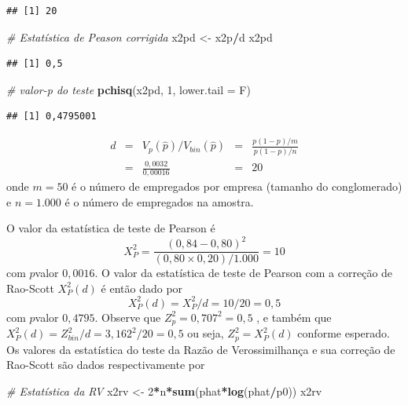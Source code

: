 \documentclass[]{book}
\newenvironment{Shaded}{\begin{snugshade}}{\end{snugshade}}
\newcommand{\KeywordTok}[1]{\textcolor[rgb]{0.13,0.29,0.53}{\textbf{#1}}}
\newcommand{\DataTypeTok}[1]{\textcolor[rgb]{0.13,0.29,0.53}{#1}}
\newcommand{\DecValTok}[1]{\textcolor[rgb]{0.00,0.00,0.81}{#1}}
\newcommand{\StringTok}[1]{\textcolor[rgb]{0.31,0.60,0.02}{#1}}
\newcommand{\CommentTok}[1]{\textcolor[rgb]{0.56,0.35,0.01}{\textit{#1}}}
\newcommand{\OperatorTok}[1]{\textcolor[rgb]{0.81,0.36,0.00}{\textbf{#1}}}
\newcommand{\NormalTok}[1]{#1}
\theoremstyle{definition}
\theoremstyle{definition}
\theoremstyle{definition}
\theoremstyle{remark}
\begin{document}
\begin{verbatim}
## [1] 20
\end{verbatim}

\begin{Shaded}
\begin{Highlighting}[]
\CommentTok{# Estatística de Peason corrigida}
\NormalTok{x2pd <-}\StringTok{ }\NormalTok{x2p}\OperatorTok{/}\NormalTok{d}
\NormalTok{x2pd}
\end{Highlighting}
\end{Shaded}

\begin{verbatim}
## [1] 0,5
\end{verbatim}

\begin{Shaded}
\begin{Highlighting}[]
\CommentTok{# valor-p do teste}
\KeywordTok{pchisq}\NormalTok{(x2pd, }\DecValTok{1}\NormalTok{, }\DataTypeTok{lower.tail =}\NormalTok{ F)}
\end{Highlighting}
\end{Shaded}

\begin{verbatim}
## [1] 0,4795001
\end{verbatim}

\[
\begin{array}{llcll}
d & = & V_{p}\left( \widehat{p}\right) /V_{bin}\left( \widehat{p}\right) & =
& \frac{p\left( 1-p\right) /m}{p\left( 1-p\right) /n} \\ 
& = & \frac{0,0032}{0,00016} & = & 20
\end{array}
\] onde \(m=50\) é o número de empregados por empresa (tamanho do
conglomerado) e \(n=1.000\) é o número de empregados na amostra.

O valor da estatística de teste de Pearson é \[
X_{P}^{2}=\frac{\left( 0,84-0,80\right) ^{2}}{\left( 0,80\times 0,20\right)
/1.000}=10 
\] com \(p\)valor \(0,0016\). O valor da estatística de teste de Pearson
com a correção de Rao-Scott \(X_{P}^{2}(d)\) é então dado por \[
X_{P}^{2}(d)=X_{P}^{2}/d=10/20=0,5 
\] com \(p\)valor \(0,4795\). Observe que \(Z_{p}^{2}=0,707^{2}=0,5\) ,
e também que \(X_{P}^{2}(d)=Z_{bin}^{2}/d= 3,162^{2}/20=0,5\) ou seja,
\(Z_{p}^{2}=X_{P}^{2}(d)\) conforme esperado. Os valores da estatística
do teste da Razão de Verossimilhança e sua correção de Rao-Scott são
dados respectivamente por

\begin{Shaded}
\begin{Highlighting}[]
\CommentTok{# Estatística da RV}
\NormalTok{x2rv <-}\StringTok{ }\DecValTok{2}\OperatorTok{*}\NormalTok{n}\OperatorTok{*}\KeywordTok{sum}\NormalTok{(phat}\OperatorTok{*}\KeywordTok{log}\NormalTok{(phat}\OperatorTok{/}\NormalTok{p0))}
\NormalTok{x2rv}
\end{Highlighting}
\end{Shaded}
\end{document}
